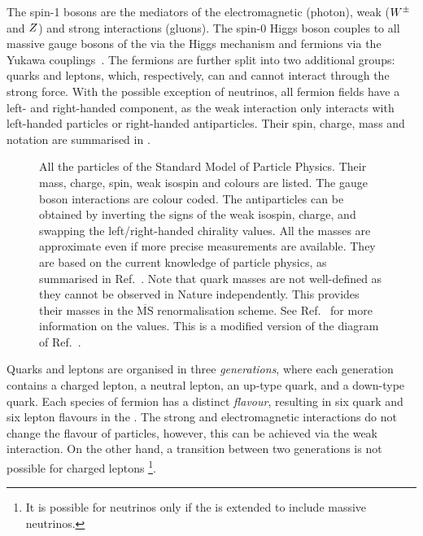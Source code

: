 The spin-1 bosons are the mediators of the electromagnetic (photon), weak ($W^\pm$ and $Z$) and strong interactions (gluons).
The spin-0 Higgs boson couples to all massive gauge bosons of the \SM via the Higgs mechanism \cite{PhysRevLett.13.508} and fermions via the Yukawa couplings~\cite{Weinberg:1967t}.
The fermions are further split into two additional groups: quarks and leptons, which, respectively, can and cannot interact through the strong force.
With the possible exception of neutrinos, all fermion fields have a left- and right-handed component, as the weak interaction only interacts with
left-handed particles or right-handed antiparticles.
Their spin, charge, mass and notation are summarised in .
\begin{figure}[hbtp!]
    \centering
    
    \caption{\label{fig:standard_model} All the particles of the Standard Model of Particle Physics.
    Their mass, charge, spin, weak isospin and colours are listed.
    The gauge boson interactions are colour coded.
    The antiparticles can be obtained by inverting the signs of the weak isospin, charge, 
    and swapping the left/right-handed chirality values.
    All the masses are approximate even if more precise measurements are available.
    They are based on the current knowledge of particle physics, as summarised in Ref.~\cite{Workman:2022ynf}.
    Note that quark masses are not well-defined as they cannot be observed in Nature independently.
    This provides their masses in the $\overline{\mathrm{MS}}$ renormalisation scheme.
    See Ref.~\cite{Workman:2022ynf} for more information on the values.
    This is a modified version of the diagram of Ref.~\cite{sm_diagram}.
    }
\end{figure}

Quarks and leptons are organised in three \textit{generations}, 
where each generation contains a charged lepton, a neutral lepton, an up-type quark, and a down-type quark.
Each species of fermion has a distinct \textit{flavour}, resulting in six quark and six lepton flavours in the \SM.
The strong and electromagnetic interactions do not change the flavour of particles, 
however, this can be achieved via the weak interaction.
On the other hand, a transition between two generations is not possible for charged leptons
\footnote{It is possible for neutrinos only if the \SM is extended to include massive neutrinos.}.

